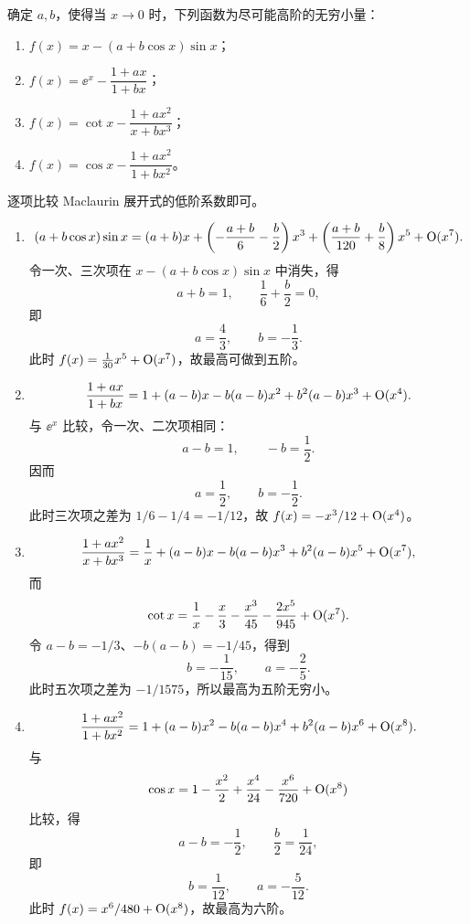 \begin{xexercise}[3]
确定 $a,b$，使得当 $x\to0$ 时，下列函数为尽可能高阶的无穷小量：
  \begin{enumerate}[label=(\arabic*)]
    \item $f(x)=x-(a+b\cos x)\sin x$；
    \item $f(x)=\ee^x-\dfrac{1+ax}{1+bx}$；
    \item $f(x)=\cot x-\dfrac{1+ax^2}{x+bx^3}$；
    \item $f(x)=\cos x-\dfrac{1+ax^2}{1+bx^2}$。
  \end{enumerate}
\end{xexercise}
\begin{xsolution}
逐项比较 Maclaurin 展开式的低阶系数即可。
\begin{enumerate}[label=(\arabic*)]
  \item
  \[
    (a+b\cos x)\sin x
    =(a+b)x+\left(-\frac{a+b}{6}-\frac b2\right)x^3
    +\left(\frac{a+b}{120}+\frac b8\right)x^5+\mathrm{O}(x^7).
  \]
  令一次、三次项在 $x-(a+b\cos x)\sin x$ 中消失，得
  \[
    a+b=1,\qquad \frac16+\frac b2=0,
  \]
  即
  \[
    a=\frac43,\qquad b=-\frac13.
  \]
  此时 $f(x)=\frac1{30}x^5+\mathrm{O}(x^7)$，故最高可做到五阶。

  \item
  \[
    \frac{1+ax}{1+bx}
    =1+(a-b)x-b(a-b)x^2+b^2(a-b)x^3+\mathrm{O}(x^4).
  \]
  与 $\ee^x$ 比较，令一次、二次项相同：
  \[
    a-b=1,\qquad -b=\frac12.
  \]
  因而
  \[
    a=\frac12,\qquad b=-\frac12.
  \]
  此时三次项之差为 $1/6-1/4=-1/12$，故 $f(x)=-x^3/12+\mathrm{O}(x^4)$。

  \item
  \[
    \frac{1+ax^2}{x+bx^3}
    =\frac1x+(a-b)x-b(a-b)x^3+b^2(a-b)x^5+\mathrm{O}(x^7),
  \]
  而
  \[
    \cot x=\frac1x-\frac x3-\frac{x^3}{45}-\frac{2x^5}{945}+\mathrm{O}(x^7).
  \]
  令 $a-b=-1/3$、$-b(a-b)=-1/45$，得到
  \[
    b=-\frac1{15},\qquad a=-\frac25.
  \]
  此时五次项之差为 $-1/1575$，所以最高为五阶无穷小。

  \item
  \[
    \frac{1+ax^2}{1+bx^2}
    =1+(a-b)x^2-b(a-b)x^4+b^2(a-b)x^6+\mathrm{O}(x^8).
  \]
  与
  \[
    \cos x=1-\frac{x^2}{2}+\frac{x^4}{24}-\frac{x^6}{720}+\mathrm{O}(x^8)
  \]
  比较，得
  \[
    a-b=-\frac12,\qquad \frac b2=\frac1{24},
  \]
  即
  \[
    b=\frac1{12},\qquad a=-\frac5{12}.
  \]
  此时 $f(x)=x^6/480+\mathrm{O}(x^8)$，故最高为六阶。
\end{enumerate}
\end{xsolution}


